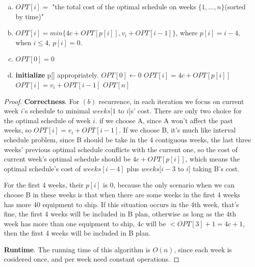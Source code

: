 \documentclass[paper=a4, fontsize=11pt]{scrartcl} %
\numberwithin{equation}{section} %
\numberwithin{figure}{section} %
\numberwithin{table}{section} %
\newenvironment{myproof}{\begin{proof}\setlength{\parindent}{2em}}{\end{proof}}
\begin{document}
\begin{enumerate}[(a)]
\item
$OPT[i] = $ "the total cost of the optimal schedule on weeks $\{1, \ldots , n\}$(sorted by time)"
\item
$OPT[i] = min\{4c+OPT[p[i]],  v_i+OPT[i-1]\}$, where $p[i]=i-4$, when $i\leq 4$, $p[i] = 0$.
\item
$OPT[0] = 0$
\item
\begin{algorithmic}
\STATE \textbf{initialize} p[] appropriately.
\STATE $OPT[0] \leftarrow 0$
		\STATE  $OPT[i] = 4c + OPT[p[i]]$
	\ELSE
		\STATE $OPT[i] = v_i+OPT[i-1]$
	\ENDIF
\ENDFOR
\RETURN $OPT[n]$
\end{algorithmic}
\end{enumerate}
\begin{myproof}
\textbf{Correctness}. 
For $(b)$ recurrence,  in each iteration we focus on current week $i$'s schedule to minimal $weeks[1$ to $i]$s' cost. There are only two choice for the optimal schedule of week $i$. if we choose A, since A won't affect the past weeks, so $OPT[i] = v_i + OPT[i-1]$. If we choose B, it's much like interval schedule problem, since B should be take in the 4 contiguous weeks, the last three weeks' previous optimal schedule conflicts with the current one, so the cost of current week's optimal schedule should be $4c+OPT[p[i]]$, which means the optimal schedule's cost of $weeks[i-4]$ plus $weeks[i-3$ to $i]$ taking B's cost.

For the first 4 weeks, their $p[i]$ is 0, because the only scenario when we can choose B in these weeks is that when there are some weeks in the first 4 weeks has more 40 equipment to ship. If this situation occurs in the 4th week, that's fine, the first 4 weeks will be included in B plan, otherwise as long as the 4th week has more than one equipment to ship, $4c$ will be $< OPT[3]+1 = 4c+1$, then the first 4 weeks will be included in B plan.

\textbf{Runtime}.
The running time of this algorithm is $O(n)$, since each week is cosidered once, and per week need constant operations.
\end{myproof}
\end{document}
